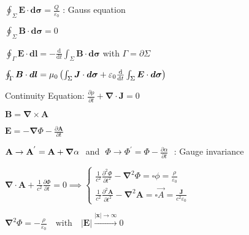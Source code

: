 \item $ \oint_{\Sigma}\boldsymbol{E} \cdot \boldsymbol{d\sigma} = \frac{Q}{\varepsilon_0}$ : Gauss equation

\item $ \oint_{\Sigma}\boldsymbol{B} \cdot \boldsymbol{d\sigma} = 0$

\item $ \oint_{\Gamma} \boldsymbol{E} \cdot \boldsymbol{dl} = -\frac{\text{d}}{\text{d}t}\int_{\Sigma} \boldsymbol{B} \cdot \boldsymbol{d\sigma}$ with $\Gamma=\partial\Sigma$

\item $ \oint_{\Gamma} \boldsymbol{B} \cdot \boldsymbol{dl} = \mu_0 \left(\int_{\Sigma} \boldsymbol{J} \cdot \boldsymbol{d\sigma} + \varepsilon_0 \frac{\ud }{\ud t}\int_{\Sigma} \boldsymbol{E} \cdot \boldsymbol{d\sigma}\right)$ 

\item Continuity Equation: $\frac{\partial \rho}{\partial t} + \boldsymbol{\nabla}\cdot\boldsymbol{J} = 0$
\squishend

\squishlist
\item $\boldsymbol{B} = \boldsymbol{\nabla} \times \boldsymbol{A}$

\item $\boldsymbol{E} = -\boldsymbol{\nabla} \Phi - \frac{\partial \boldsymbol{A}}{\partial t}$

\item $\vec{\rm{A}} \rightarrow \vec{\rm{A}}^{'} = \vec{\rm{A}} + \vec{\nabla}\alpha \,\,$  and  $\,\, \Phi \rightarrow \Phi^{'} = \Phi - \frac{\partial\alpha}{\partial t} \,\,$ : Gauge invariance 
\squishend
{}

$\boldsymbol{\nabla} \cdot \boldsymbol{A} + \frac{1}{c^2}\frac{\partial \Phi}{\partial t}=0\implies
\begin{cases}
\frac{1}{c^2}\frac{\partial^2 \Phi }{\partial t^2} - \boldsymbol{\nabla}^2 \Phi = \square \phi = \frac{\rho}{\varepsilon_0} \\
\frac{1}{c^2}\frac{\partial^2 \boldsymbol{A}}{\partial t^2} - \boldsymbol{\nabla}^2 \boldsymbol{A} = \square \vec{A} =  \frac{\boldsymbol{J}}{c^2\varepsilon_0}
\end{cases}$


\squishlist
\item $\boldsymbol{\nabla}^2\Phi = -\frac{\rho}{\varepsilon_0} \quad \text{with} \quad |\boldsymbol{E}| \overset{|\boldsymbol{x}|\to \infty}{\longrightarrow} 0$


